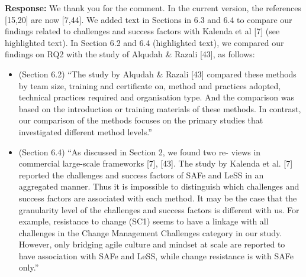 \documentclass[a4paper,twoside,11pt]{reviewresponse}
\begin{document}
\textbf{Response:}
We thank you for the comment. In the current version, the references [15,20] are now [7,44]. We added text in Sections in 6.3 and 6.4 to compare our findings related to challenges and success factors with Kalenda et al [7] (see highlighted text). In Section 6.2 and 6.4 (highlighted text), we compared our findings on RQ2 with the study of Alqudah \& Razali [43], as follows:
\begin{itemize}
	\item (Section 6.2) ``The study by Alqudah \& Razali [43] compared these methods by team size, training and certificate on, method and practices adopted, technical practices required and organisation type. And the comparison was based on the introduction or training materials of these methods. In contrast, our comparison of the methods focuses on the primary studies that investigated different method levels.''
	\item (Section 6.4) ``As discussed in Section 2, we found two re- views in commercial large-scale frameworks [7], [43]. The study by Kalenda et al. [7] reported the challenges and success factors of SAFe and LeSS in an aggregated manner. Thus it is impossible to distinguish which challenges and success factors are associated with each method. It may be the case that the granularity level of the challenges and success factors is different with us. For example, resistance to change (SC1) seems to have a linkage with all challenges in the Change Management Challenges category in our study. However, only bridging agile culture and mindset at scale are reported to have association with SAFe and LeSS, while change resistance is with SAFe only.''
\end{itemize}


\end{document}
